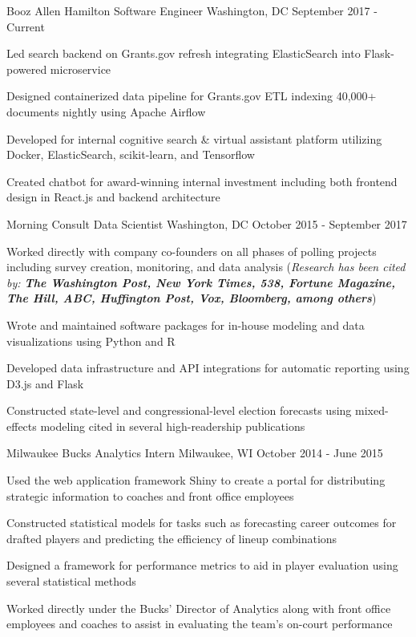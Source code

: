 \documentclass[11pt, a4paper]{awesome-cv}
\begin{document}
\begin{cventries}
  \cventry
    {Booz Allen Hamilton}
    {Software Engineer}
    {Washington, DC}
    {September 2017 - Current}
    {
      \begin{cvitems}
        \item{Led search backend on Grants.gov refresh integrating ElasticSearch into Flask-powered microservice}
        \item{Designed containerized data pipeline for Grants.gov ETL indexing 40,000+ documents nightly using Apache Airflow}
        \item{Developed for internal cognitive search \& virtual assistant platform utilizing Docker, ElasticSearch, scikit-learn, and Tensorflow}
        \item{Created chatbot for award-winning internal investment including both frontend design in React.js and backend architecture}
      \end{cvitems}
    }
  \cventry
    {Morning Consult}
    {Data Scientist}
    {Washington, DC}
    {October 2015 - September 2017}
    {
      \begin{cvitems}
        \item{Worked directly with company co-founders on all phases of polling projects including survey creation,
        monitoring, and data analysis (\textit{Research has been cited by: \textbf{The Washington Post, New York Times, 538, Fortune Magazine, The Hill, ABC, Huffington Post, Vox, Bloomberg, among others}})}
        \item{Wrote and maintained software packages for in-house modeling and data visualizations using Python and R}
        \item{Developed data infrastructure and API integrations for automatic reporting using D3.js and Flask}
        \item{Constructed state-level and congressional-level election forecasts using mixed-effects modeling cited in several high-readership publications}
      \end{cvitems}
    }
  \cventry
    {Milwaukee Bucks}
    {Analytics Intern}
    {Milwaukee, WI}
    {October 2014 - June 2015}
    {
      \begin{cvitems}
        \item{Used the web application framework Shiny to create a portal for distributing strategic information to coaches and front office employees}
        \item{Constructed statistical models for tasks such as forecasting career outcomes for drafted players
and predicting the efficiency of lineup combinations}
         \item{Designed a framework for performance metrics to aid in player evaluation using several statistical
methods}
        \item{Worked directly under the Bucks’ Director of Analytics along with front office employees and
coaches to assist in evaluating the team’s on-court performance}
      \end{cvitems}
    }

\end{cventries}
\end{document}
